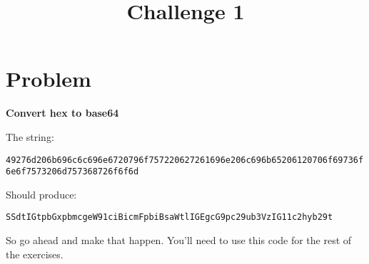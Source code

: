\documentclass[a4paper,10pt]{article}
\begin{document}
\title{Challenge 1}
\date{}

\maketitle

\section{Problem} %
\label{sec:problem}

{\bf Convert hex to base64}

The string:

\verb+49276d206b696c6c696e6720796f757220627261696e206c696b65206120706f69736f6e6f7573206d757368726f6f6d+

Should produce:

\verb+SSdtIGtpbGxpbmcgeW91ciBicmFpbiBsaWtlIGEgcG9pc29ub3VzIG11c2hyb29t+

So go ahead and make that happen. You'll need to use this code for the rest of the exercises. 
\end{document}
